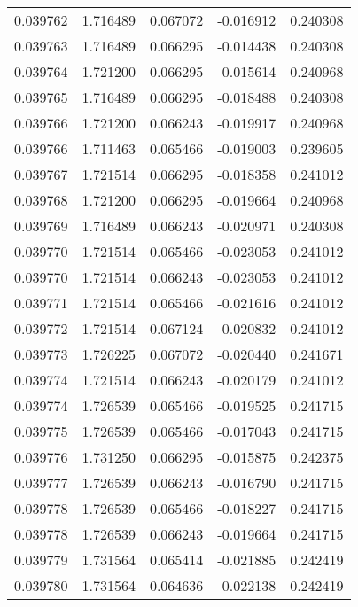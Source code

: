 \begin{tabular}{lrrrr}
0.039762    &  1.716489 &  0.067072 & -0.016912 &             0.240308 \\
0.039763    &  1.716489 &  0.066295 & -0.014438 &             0.240308 \\
0.039764    &  1.721200 &  0.066295 & -0.015614 &             0.240968 \\
0.039765    &  1.716489 &  0.066295 & -0.018488 &             0.240308 \\
0.039766    &  1.721200 &  0.066243 & -0.019917 &             0.240968 \\
0.039766    &  1.711463 &  0.065466 & -0.019003 &             0.239605 \\
0.039767    &  1.721514 &  0.066295 & -0.018358 &             0.241012 \\
0.039768    &  1.721200 &  0.066295 & -0.019664 &             0.240968 \\
0.039769    &  1.716489 &  0.066243 & -0.020971 &             0.240308 \\
0.039770    &  1.721514 &  0.065466 & -0.023053 &             0.241012 \\
0.039770    &  1.721514 &  0.066243 & -0.023053 &             0.241012 \\
0.039771    &  1.721514 &  0.065466 & -0.021616 &             0.241012 \\
0.039772    &  1.721514 &  0.067124 & -0.020832 &             0.241012 \\
0.039773    &  1.726225 &  0.067072 & -0.020440 &             0.241671 \\
0.039774    &  1.721514 &  0.066243 & -0.020179 &             0.241012 \\
0.039774    &  1.726539 &  0.065466 & -0.019525 &             0.241715 \\
0.039775    &  1.726539 &  0.065466 & -0.017043 &             0.241715 \\
0.039776    &  1.731250 &  0.066295 & -0.015875 &             0.242375 \\
0.039777    &  1.726539 &  0.066243 & -0.016790 &             0.241715 \\
0.039778    &  1.726539 &  0.065466 & -0.018227 &             0.241715 \\
0.039778    &  1.726539 &  0.066243 & -0.019664 &             0.241715 \\
0.039779    &  1.731564 &  0.065414 & -0.021885 &             0.242419 \\
0.039780    &  1.731564 &  0.064636 & -0.022138 &             0.242419 \\

\end{tabular}
